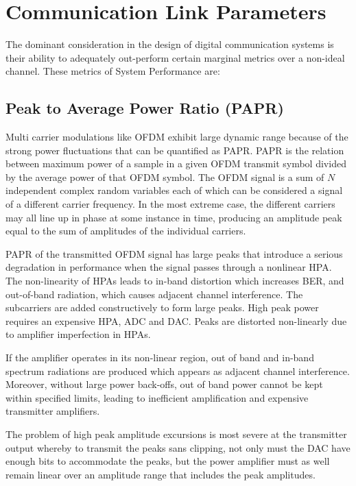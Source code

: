 \section{Communication Link Parameters}
The dominant consideration in the design of digital communication systems is their ability to adequately out-perform certain marginal metrics over a non-ideal channel\cite{hayk}. These metrics of System Performance are:

\subsection{Peak to Average Power Ratio (\gls{PAPR})}
Multi carrier modulations like \gls{OFDM} exhibit large dynamic range because of the strong power fluctuations that can be quantified as \gls{PAPR}. \gls{PAPR} is the relation between maximum power of a sample in a given \gls{OFDM} transmit \gls{symbol} divided by the average power of that \gls{OFDM} \gls{symbol}\cite{french}. The \gls{OFDM} signal is a sum of $N$ independent complex random variables each of which can be considered a signal of a different carrier frequency. In the most extreme case, the different carriers may all line up in phase at some instance in time, producing an amplitude peak equal to the sum of amplitudes of the individual carriers.

\gls{PAPR} of the transmitted \gls{OFDM} signal has large peaks that introduce a serious degradation in performance when the signal passes through a nonlinear \gls{HPA}. The non-linearity of \gls{HPA}s leads to in-band distortion which increases \gls{BER}, and out-of-band radiation, which causes adjacent channel interference\cite{prob}. The subcarriers are added constructively to form large peaks. High peak power requires an expensive \gls{HPA}, \gls{ADC} and \gls{DAC}. Peaks are distorted non-linearly due to amplifier imperfection in \gls{HPA}s. 

If the amplifier operates in its non-linear region, out of band and in-band spectrum radiations are produced which appears as adjacent channel interference\cite{gaurav}. Moreover, without large power back-offs, out of band power cannot be kept within specified limits, leading to inefficient amplification and expensive transmitter amplifiers.
 
The problem of high peak amplitude excursions is most severe at the transmitter output whereby to transmit the peaks sans clipping, not only must the \gls{DAC} have enough bits to accommodate the peaks, but the power amplifier must as well remain linear over an amplitude range that includes the peak amplitudes\cite{ofdm_intro}.

